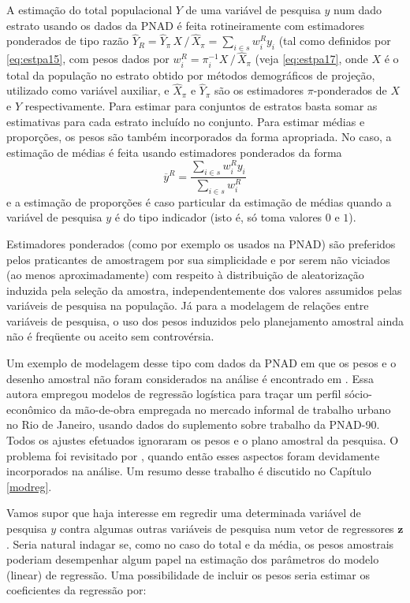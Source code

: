 \documentclass[]{book}
\numberwithin{example}{chapter}
\numberwithin{remark}{chapter}
\numberwithin{definition}{chapter}
\begin{document}
A estimação do total populacional \(Y\) de uma variável de pesquisa
\(y\) num dado estrato usando os dados da PNAD é feita rotineiramente
com estimadores ponderados de tipo razão
\(\widehat{Y}_{R}=\widehat{Y}_{\pi }\,X\,/\,\widehat{X}_{\pi }=\sum_{i\in s}w_{i}^{R}y_{i}\)
(tal como definidos por \eqref{eq:estpa15}, com pesos dados por
\(w_{i}^{R}=\pi_{i}^{-1}X\,/\,\widehat{X}_{\pi }\) (veja
\eqref{eq:estpa17}, onde \(X\) é o total da população no estrato obtido
por métodos demográficos de projeção, utilizado como variável auxiliar,
e \(\widehat{X}_{\pi}\) e \(\widehat{Y}_{\pi}\) são os estimadores
\(\pi\)-ponderados de \(X\) e \(Y\) respectivamente. Para estimar para
conjuntos de estratos basta somar as estimativas para cada estrato
incluído no conjunto. Para estimar médias e proporções, os pesos são
também incorporados da forma apropriada. No caso, a estimação de médias
é feita usando estimadores ponderados da forma \[
\overline{y}^{R}=\frac{\sum_{i\in s}w_{i}^{R}y_{i}}{\sum_{i\in s}w_{i}^{R}} 
\] e a estimação de proporções é caso particular da estimação de médias
quando a variável de pesquisa \(y\) é do tipo indicador (isto é, só toma
valores \(0\) e \(1\)).

Estimadores ponderados (como por exemplo os usados na PNAD) são
preferidos pelos praticantes de amostragem por sua simplicidade e por
serem não viciados (ao menos aproximadamente) com respeito à
distribuição de aleatorização induzida pela seleção da amostra,
independentemente dos valores assumidos pelas variáveis de pesquisa na
população. Já para a modelagem de relações entre variáveis de pesquisa,
o uso dos pesos induzidos pelo planejamento amostral ainda não é
freqüente ou aceito sem controvérsia.

Um exemplo de modelagem desse tipo com dados da PNAD em que os pesos e o
desenho amostral não foram considerados na análise é encontrado em
\citep{Leote}. Essa autora empregou modelos de regressão logística para
traçar um perfil sócio-econômico da mão-de-obra empregada no mercado
informal de trabalho urbano no Rio de Janeiro, usando dados do
suplemento sobre trabalho da PNAD-90. Todos os ajustes efetuados
ignoraram os pesos e o plano amostral da pesquisa. O problema foi
revisitado por \citep{Pessoa}, quando então esses aspectos foram
devidamente incorporados na análise. Um resumo desse trabalho é
discutido no Capítulo \ref{modreg}.

Vamos supor que haja interesse em regredir uma determinada variável de
pesquisa \(y\) contra algumas outras variáveis de pesquisa num vetor de
regressores \(\mathbf{z}\). Seria natural indagar se, como no caso do
total e da média, os pesos amostrais poderiam desempenhar algum papel na
estimação dos parâmetros do modelo (linear) de regressão. Uma
possibilidade de incluir os pesos seria estimar os coeficientes da
regressão por:
\end{document}
